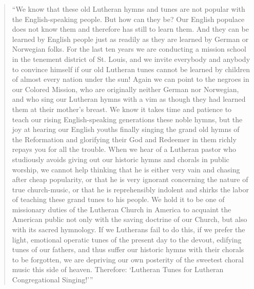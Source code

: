 \begin{quote}
“We know that these old Lutheran hymns and tunes are not popular with the English-speaking people. But how can they be? Our English populace does not know them and therefore has still to learn them. And they can be learned by English people just as readily as they are learned by German or Norwegian folks. For the last ten years we are conducting a mission school in the tenement district of St. Louis, and we invite everybody and anybody to convince himself if our old Lutheran tunes cannot be learned by children of almost every nation under the sun! Again we can point to the negroes in our Colored Mission, who are originally neither German nor Norwegian, and who sing our Lutheran hymns with a vim as though they had learned them at their mother's breast. We know it takes time and patience to teach our rising English-speaking generations these noble hymns, but the joy at hearing our English youths finally singing the grand old hymns of the Reformation and glorifying their God and Redeemer in them richly repays you for all the trouble. When we hear of a Lutheran pastor who studiously avoids giving out our historic hymns and chorals in public worship, we cannot help thinking that he is either very vain and chasing after cheap popularity, or that he is very ignorant concerning the nature of true church-music, or that he is reprehensibly indolent and shirks the labor of teaching these grand tunes to his people. We hold it to be one of missionary duties of the Lutheran Church in America to acquaint the American public not only with the saving doctrine of our Church, but also with its sacred hymnology. If we Lutherans fail to do this, if we prefer the light, emotional operatic tunes of the present day to the devout, edifying tunes of our fathers, and thus suffer our historic hymns with their chorals to be forgotten, we are depriving our own posterity of the sweetest choral music this side of heaven. Therefore: ‘Lutheran Tunes for Lutheran Congregational Singing!’”\end{quote}

